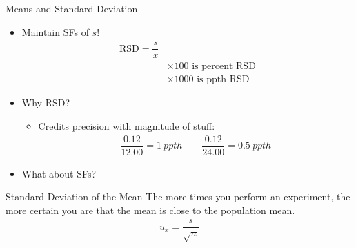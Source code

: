 \documentclass[handout]{beamer}
\begin{document}
\begin{frame}{Means and Standard Deviation}
{	\begin{itemize}
		\item Maintain SFs of $s$!
			\begin{align*}
				\text{RSD} = \dfrac{s}{\bar{x}} & \\
				&\times 100 \text{ is percent RSD} \\
				&\times 1000 \text{ is ppth RSD}
			\end{align*}
		\item Why RSD?
			\begin{itemize}
				\item Credits precision with magnitude of stuff:
					\begin{align*}
						\dfrac{0.12}{12.00} = \SI{1}{ppth}
						\qquad
						\dfrac{0.12}{24.00} =
						\SI{0.5}{ppth}%
					\end{align*}
			\end{itemize}
		\item What about SFs?
	\end{itemize}
}
\end{frame}

\begin{frame}[t]{Standard Deviation of the Mean}
	The more times you perform an experiment, the more certain you are that
	the mean is close to the population mean.
	\begin{align*}
		u_x = \dfrac{s}{\sqrt{n}}
	\end{align*}

%
%	
\end{frame}


\end{document}
